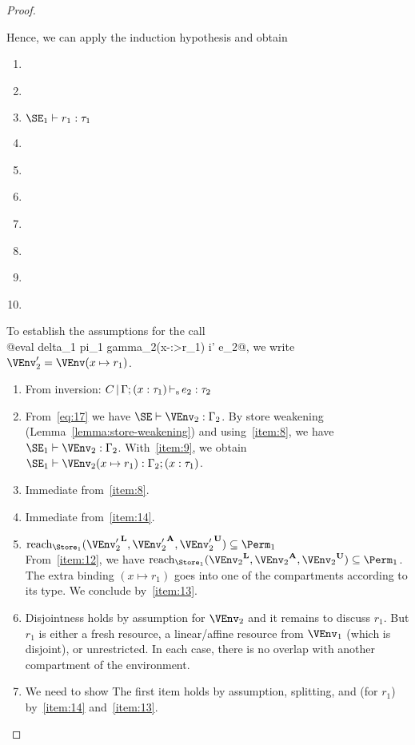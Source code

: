 \begin{proof}
\begin{enumerate}[({A1-}1)]
  \end{enumerate}
  Hence, we can apply the induction hypothesis and obtain
  \begin{enumerate}[({R1-}1)]
  \item {}
  \item\label{item:8} 
  \item\label{item:9} $\SE_1 \vdash r_1 : \tau_1$
  \item\label{item:14} 
  \item\label{item:13} 
  \item\label{item:16} 
  \item\label{item:24} 
  \item\label{item:26} 
  \item\label{item:30} 
  \item\label{item:10} 
  \end{enumerate}
  To establish the assumptions for the call \\
  @eval delta_1 pi_1 gamma_2(x-:>r_1) i' e_2@,
  we write $\VEnv_2' = \VEnv (x \mapsto r_1)$.
  \begin{enumerate}[({A2-}1)]
  \item From inversion: $C \operatorname{|} \Gamma;(x : \tau_1) \operatorname{\vdash_s} e_2 : \tau_2$
  \item From~\eqref{eq:17} we have $\SE \vdash \VEnv_2 : \E_2$.
    By store weakening (Lemma~\ref{lemma:store-weakening}) and
    using~\ref{item:8}, we have
    $\SE_1 \vdash \VEnv_2 : \E_2$.
    With~\ref{item:9}, we obtain
    $\SE_1 \vdash \VEnv_2 (x \mapsto r_1 ) : \E_2;\bvar x {\tau_1}$.
  \item Immediate from~\ref{item:8}.
  \item Immediate from~\ref{item:14}.
  \item $\Reach{\Store_1}{\Active{\VEnv_2'}, \MutableBorrows{\VEnv_2'},
      \ImmutableBorrows{\VEnv_2'}} \subseteq \Perm_1$ \\
    From~\ref{item:12}, we have
     $\Reach{\Store_1}{\Active{\VEnv_2}, \MutableBorrows{\VEnv_2},
      \ImmutableBorrows{\VEnv_2}} \subseteq \Perm_1$. The extra
    binding $(x \mapsto r_1)$ goes into one of the compartments
    according to its type. We conclude by~\ref{item:13}.
  \item Disjointness holds by assumption for $\VEnv_2$ and it remains
    to discuss $r_1$. But $r_1$ is either a fresh resource, a
    linear/affine resource from $\VEnv_1$ (which is disjoint), or
    unrestricted. In each case, there is no overlap with another
    compartment of the environment.
  \item We need to show
    The first item holds by assumption, splitting, and (for $r_1$)
    by~\ref{item:14} and~\ref{item:13}.


\end{enumerate}
\end{proof}

